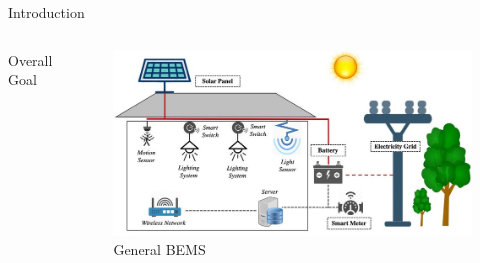 \documentclass{beamer}
\begin{document}
\begin{frame}{Introduction}{}
\begin{columns}
{\begin{block}{Overall Goal}
\begin{itemize}
        \end{itemize}
      \end{block}
      }
    \begin{figure}
      \centering
      \includegraphics[scale=0.25]{figs/BEMS_Image.jpg}
      \caption{General BEMS}
      \label{fig:high_level_arch}
    \end{figure}
  \end{columns}
\end{frame}
\end{document}
